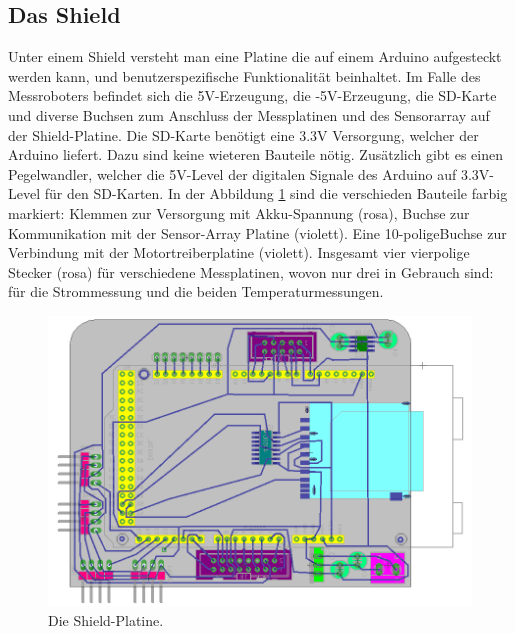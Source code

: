 \documentclass[a4paper,bibtotoc,oneside]{scrbook}
\begin{document}
\subsection{Das Shield}\thispagestyle{empty}
Unter einem Shield versteht man eine Platine die auf einem Arduino aufgesteckt werden kann, und benutzerspezifische Funktionalität beinhaltet. Im Falle des Messroboters befindet sich die 5V-Erzeugung, die -5V-Erzeugung, die SD-Karte und diverse Buchsen zum Anschluss der Messplatinen und des Sensorarray auf der Shield-Platine. 
Die SD-Karte benötigt eine 3.3V Versorgung, welcher der Arduino liefert. Dazu sind keine wieteren Bauteile nötig. 
Zusätzlich gibt es einen Pegelwandler, welcher die 5V-Level der digitalen Signale des Arduino auf 3.3V-Level für den SD-Karten.
In der Abbildung  \ref{shield} sind die verschieden Bauteile farbig markiert:
Klemmen zur Versorgung mit Akku-Spannung (rosa), Buchse zur Kommunikation mit der Sensor-Array Platine (violett). Eine 10-poligeBuchse zur Verbindung mit der Motortreiberplatine (violett). Insgesamt vier vierpolige Stecker (rosa) für verschiedene Messplatinen, wovon nur drei in Gebrauch sind: für die Strommessung und die beiden Temperaturmessungen.

\begin{figure}[htbp]
\centering
\includegraphics[width=125mm]{img/shield.png}
\caption{Die Shield-Platine.}\label{shield}
\end{figure}
\end{document}
